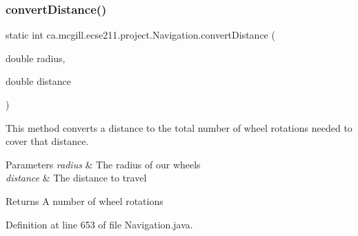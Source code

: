 \mbox{\label{classca_1_1mcgill_1_1ecse211_1_1project_1_1_navigation_ac9e260bcd619ffa4820d7d0de7ea1c12}} 
\subsubsection{\texorpdfstring{convert\+Distance()}{convertDistance()}}
{\footnotesize\ttfamily static int ca.\+mcgill.\+ecse211.\+project.\+Navigation.\+convert\+Distance (\begin{DoxyParamCaption}\item[{double}]{radius,  }\item[{double}]{distance }\end{DoxyParamCaption})\hspace{0.3cm}{\ttfamily [static]}}

This method converts a distance to the total number of wheel rotations needed to cover that distance.


\begin{DoxyParams}{Parameters}
{\em radius} & The radius of our wheels \\
\hline
{\em distance} & The distance to travel \\
\hline
\end{DoxyParams}
\begin{DoxyReturn}{Returns}
A number of wheel rotations 
\end{DoxyReturn}


Definition at line 653 of file Navigation.\+java.


